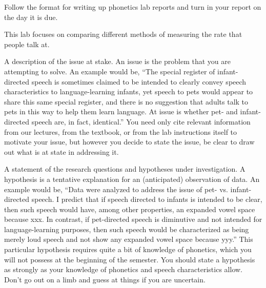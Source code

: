 \documentclass[lab=1,title={Speaking rate},turnin=false]{com310lab}
\begin{document}
\begin{writeup}
	Follow the format for writing up phonetics lab reports and turn in your report on the day it is due.
\end{writeup}

\pagebreak

\labtitle

\begin{topic}
	This lab focuses on comparing different methods of measuring the rate that people talk at.
\end{topic}

\begin{issue}%
	A description of the issue at stake.
	An issue is the problem that you are attempting to solve.
	An example would be,
	``The special register of infant-directed speech is sometimes claimed to be intended to clearly convey speech characteristics to language-learning infants, yet speech to pets would appear to share this same special register, and there is no suggestion that adults talk to pets in this way to help them learn language.
	At issue is whether pet- and infant-directed speech are, in fact, identical.''
	You need only cite relevant information from our lectures, from the textbook, or from the lab instructions itself to motivate your issue, but however you decide to state the issue, be clear to draw out what is at state in addressing it.
\end{issue}

\begin{hypothesis}%
	A statement of the research questions and hypotheses under investigation.
	A hypothesis is a tentative explanation for an (anticipated) observation of data.
	An example would be, ``Data were analyzed to address the issue of pet- vs. infant-directed speech.
	I predict that if speech directed to infants is intended to be clear, then such speech would have, among other properties, an expanded vowel space because xxx.
	In contrast, if pet-directed speech is diminutive and not intended for language-learning purposes, then such speech would be characterized as being merely loud speech and not show any expanded vowel space because yyy.''
	This particular hypothesis requires quite a bit of knowledge of phonetics, which you will not possess at the beginning of the semester.
	You should state a hypothesis as strongly as your knowledge of phonetics and speech characteristics allow.
	Don’t go out on a limb and guess at things if you are uncertain.
\end{hypothesis}
\end{document}
